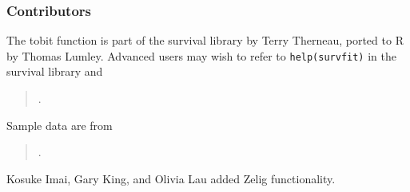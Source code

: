 \subsubsection{Contributors}

The tobit function is part of the survival library by Terry
Therneau, ported to R by Thomas Lumley.  Advanced users may wish to
refer to \texttt{help(survfit)} in the survival library and
\begin{verse}
.
\end{verse}

Sample data are from 
\begin{verse}
.
\end{verse}

Kosuke Imai, Gary King, and Olivia Lau added Zelig functionality. 




%
